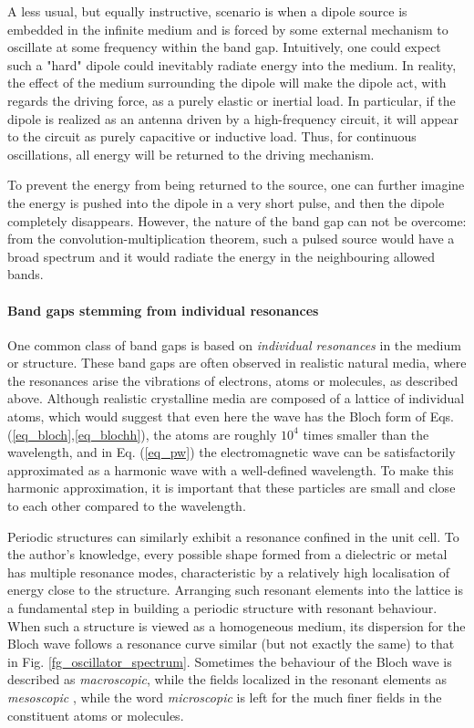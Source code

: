 A less usual, but equally instructive, scenario is when a dipole source is embedded in the infinite medium and is forced by some external mechanism to oscillate at some frequency within the band gap. Intuitively, one could expect such a "hard" dipole could inevitably radiate energy into the medium. In reality, the effect of the medium surrounding the dipole will make the dipole act, with regards the driving force, as a purely elastic or inertial load. In particular, if the dipole is realized as an antenna driven by a high-frequency circuit, it will appear to the circuit as purely capacitive or inductive load. Thus, for continuous oscillations, all energy will be returned to the driving mechanism. 

To prevent the energy from being returned to the source, one can further imagine the energy is pushed into the dipole in a very short pulse, and then the dipole completely disappears. However, the nature of the band gap can not be overcome: from the convolution-multiplication theorem, such a pulsed source would have a broad spectrum and it would radiate the energy in the neighbouring allowed bands. 

\paragraph{Band gaps stemming from individual resonances}%
One common class of band gaps is based on \textit{individual resonances} in the medium or structure. These band gaps are often observed in realistic natural media, where the resonances arise the vibrations of electrons, atoms or molecules, as described above. 
Although realistic crystalline media are composed of a lattice of individual atoms, which would suggest that even here the wave has the Bloch form of Eqs. (\ref{eq_bloch},\ref{eq_blochh}), the atoms are roughly $10^{4}$ times smaller than the wavelength, and in Eq. (\ref{eq_pw}) the electromagnetic wave can be satisfactorily approximated as a harmonic wave with a well-defined wavelength. To make this harmonic approximation, it is important that these particles are small and close to each other compared to the wavelength. %

Periodic structures can similarly exhibit a resonance confined in the unit cell. 
To the author's knowledge,  %
every possible shape formed from a dielectric or metal has multiple resonance modes,  %
characteristic by a relatively high localisation of energy close to the structure. %
Arranging such resonant elements into the lattice is a fundamental step in building a periodic structure with resonant behaviour. When such a structure is viewed as a homogeneous medium, its dispersion for the Bloch wave follows a resonance curve similar (but not exactly the same) to that in Fig. \ref{fg_oscillator_spectrum}. Sometimes the behaviour of the Bloch wave is described as \textit{macroscopic}, while the fields localized in the resonant elements as \textit{mesoscopic} \cite{felbacq2005theory}, while the word \textit{microscopic} is left for the much finer fields in the constituent atoms or molecules.

